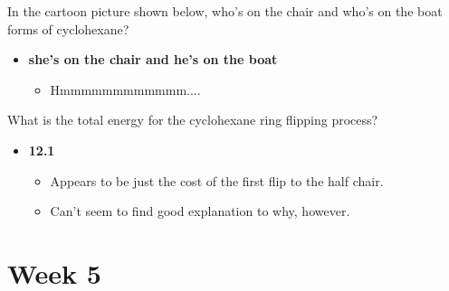 \documentclass[12pt,a4paper]{article}
\begin{document}
\begin{enumerate}
\begin{itemize}
\begin{itemize}
            \end{itemize}
        \end{itemize}
    {\color{G-Moon}\item In the cartoon picture shown below, who's on the chair and who's on the boat forms of cyclohexane?}
        \begin{itemize}
            \item {\color{o-Sun}\textbf{she's on the chair and he's on the boat}}
            \begin{itemize}
                \item Hmmmmmmmmmmmm....
            \end{itemize}
        \end{itemize}
    {\color{G-Moon}\item What is the total energy for the cyclohexane ring flipping process?}
        \begin{itemize}
            \item {\color{o-Sun}\textbf{12.1}}
            \begin{itemize}
                \item Appears to be just the cost of the first flip to the half chair.
                \item Can't seem to find good explanation to why, however.
            \end{itemize}
        \end{itemize}
\end{enumerate}

\clearpage
\section*{Week 5}
{}

\end{document}
